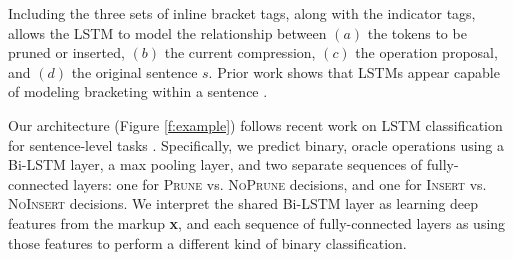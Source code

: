 \documentclass[11pt,a4paper]{article}
\begin{document}
Including the three sets of inline bracket tags, along with the indicator tags, allows the LSTM to model the relationship between $(a)$ the tokens to be pruned or inserted, $(b)$ the current compression, $(c)$ the operation proposal, and $(d)$ the original sentence $s$. Prior work shows that LSTMs appear capable of modeling bracketing within a sentence \cite{Vinyals2015GrammarAA,karpathy,Aharoni2017TowardsSN}.

Our architecture (Figure \ref{f:example}) follows recent work on LSTM classification for sentence-level tasks \cite{D17-1070}. Specifically, we predict binary, oracle operations using a Bi-LSTM layer, a max pooling layer, and two separate sequences of fully-connected layers: one for \textsc{Prune} vs. \textsc{NoPrune} decisions, and one for \textsc{Insert} vs. \textsc{NoInsert} decisions. We interpret the shared Bi-LSTM layer as learning deep features from the markup \textbf{x}, and each sequence of fully-connected layers as using those features to perform a different kind of binary classification.






\end{document}
